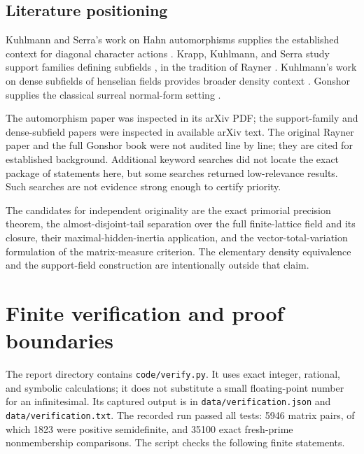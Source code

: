 \documentclass[11pt,oneside]{article}
\theoremstyle{definition}
\theoremstyle{remark}
\begin{document}
\subsection{Literature positioning}

Kuhlmann and Serra's work on Hahn automorphisms supplies the established
context for diagonal character actions \cite{automorphisms}.
Krapp, Kuhlmann, and Serra study support families defining subfields
\cite{rayner-structures}, in the tradition of Rayner
\cite{rayner}. Kuhlmann's work on dense subfields of henselian fields
provides broader density context \cite{dense-subfields}.
Gonshor supplies the classical surreal normal-form setting
\cite{gonshor}.

The automorphism paper was inspected in its arXiv PDF; the support-family
and dense-subfield papers were inspected in available arXiv text.
The original Rayner paper and the full Gonshor book were not audited
line by line; they are cited for established background. Additional
keyword searches did not locate the exact package of statements here,
but some searches returned low-relevance results. Such searches are not
evidence strong enough to certify priority.

The candidates for independent originality are the exact primorial
precision theorem, the almost-disjoint-tail separation over the full
finite-lattice field and its closure, their maximal-hidden-inertia
application, and the vector-total-variation formulation of the
matrix-measure criterion. The elementary density equivalence and the
support-field construction are intentionally outside that claim.

\section{Finite verification and proof boundaries}\label{hnd:app:checks}

The report directory contains \texttt{code/verify.py}. It uses exact integer,
rational, and symbolic calculations; it does not substitute a small
floating-point number for an infinitesimal. Its captured output is in
\texttt{data/verification.json} and \texttt{data/verification.txt}.
The recorded run passed all tests: 5946 matrix pairs, of which 1823 were
positive semidefinite, and 35100 exact fresh-prime nonmembership comparisons.
The script checks the following finite statements.
\end{document}
